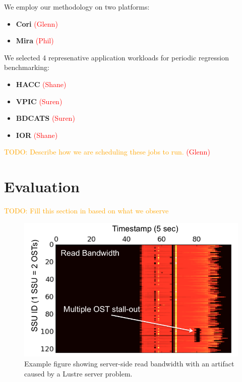 \documentclass[conference,10pt,compsocconf]{IEEEtran}
\newcommand{\assign}[1]{\textcolor{red}{(#1)}}
\newcommand{\todo}[1]{\textcolor{Orange}{TODO: #1}}
\begin{document}
We employ our methodology on two platforms:

\begin{itemize}
\item \textbf{Cori} \assign{Glenn}
\item \textbf{Mira} \assign{Phil}
\end{itemize}

We selected 4 represenative application workloads for periodic regression
benchmarking:

\begin{itemize}
\item \textbf{HACC} \assign{Shane}
\item \textbf{VPIC} \assign{Suren}
\item \textbf{BDCATS} \assign{Suren}
\item \textbf{IOR} \assign{Shane}
\end{itemize}

\todo{Describe how we are scheduling these jobs to run.} \assign{Glenn}

\section{Evaluation}

\todo{Fill this section in based on what we observe}

\begin{figure}[t]
\centering
\includegraphics[width=0.8\columnwidth]{figs/example.png}
\caption{Example figure showing server-side read bandwidth with an artifact
caused by a Lustre server problem.}
\label{fig:example}
\vspace{-.1in}
\end{figure}
\end{document}
